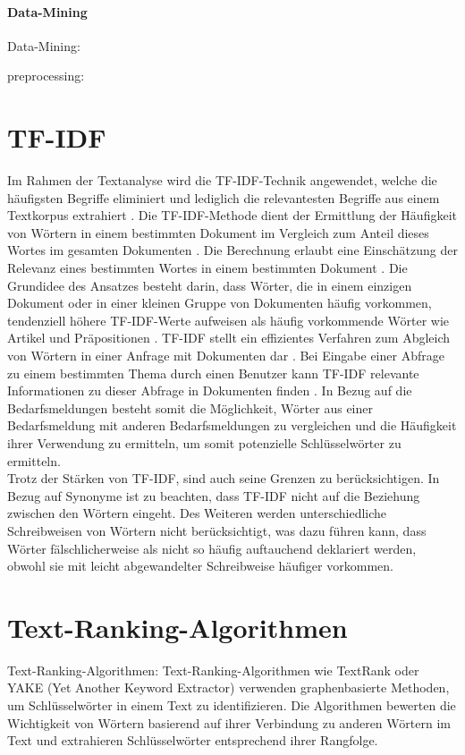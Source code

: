 \paragraph{Data-Mining}
Data-Mining: \cite{jun2001review}\cite{jain2013data}

preprocessing: \cite{garcia2016big}
\section{TF-IDF}
Im Rahmen der Textanalyse wird die TF-IDF-Technik angewendet, welche die häufigsten Begriffe eliminiert und lediglich die relevantesten Begriffe aus einem Textkorpus extrahiert \cite{bafna2016document}. Die TF-IDF-Methode dient der Ermittlung der Häufigkeit von Wörtern in einem bestimmten Dokument im Vergleich zum Anteil dieses Wortes im gesamten Dokumenten \cite{ramos2003using}. Die Berechnung erlaubt eine Einschätzung der Relevanz eines bestimmten Wortes in einem bestimmten Dokument \cite{ramos2003using}. Die Grundidee des Ansatzes besteht darin, dass Wörter, die in einem einzigen Dokument oder in einer kleinen Gruppe von Dokumenten häufig vorkommen, tendenziell höhere TF-IDF-Werte aufweisen als häufig vorkommende Wörter wie Artikel und Präpositionen \cite{ramos2003using}. TF-IDF stellt ein effizientes Verfahren zum Abgleich von Wörtern in einer Anfrage mit Dokumenten dar \cite{ramos2003using}. Bei Eingabe einer Abfrage zu einem bestimmten Thema durch einen Benutzer kann TF-IDF relevante Informationen zu dieser Abfrage in Dokumenten finden \cite{ramos2003using}. In Bezug auf die Bedarfsmeldungen besteht somit die Möglichkeit, Wörter aus einer Bedarfsmeldung mit anderen Bedarfsmeldungen zu vergleichen und die Häufigkeit ihrer Verwendung zu ermitteln, um somit potenzielle Schlüsselwörter zu ermitteln.\\

Trotz der Stärken von TF-IDF, sind auch seine Grenzen zu berücksichtigen. In Bezug auf Synonyme ist zu beachten, dass TF-IDF nicht auf die Beziehung zwischen den Wörtern eingeht. Des Weiteren werden unterschiedliche Schreibweisen von Wörtern nicht berücksichtigt, was dazu führen kann, dass Wörter fälschlicherweise als nicht so häufig auftauchend deklariert werden, obwohl sie mit leicht abgewandelter Schreibweise häufiger vorkommen.
\section{Text-Ranking-Algorithmen}
Text-Ranking-Algorithmen: Text-Ranking-Algorithmen wie TextRank oder YAKE (Yet Another Keyword Extractor) verwenden graphenbasierte Methoden, um Schlüsselwörter in einem Text zu identifizieren. Die Algorithmen bewerten die Wichtigkeit von Wörtern basierend auf ihrer Verbindung zu anderen Wörtern im Text und extrahieren Schlüsselwörter entsprechend ihrer Rangfolge.\\ \cite{mihalcea2004textrank}\cite{zhang2020empirical}\cite{pay2019ensemble}\\


